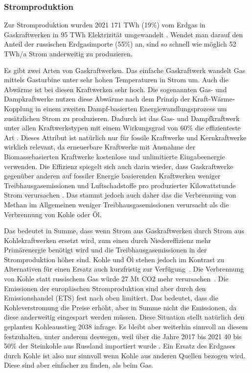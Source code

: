 \subsubsection{Stromproduktion}
\label{sec:Stromproduktion}

Zur Stromproduktion wurden 2021 171 TWh (19\%) vom Erdgas in Gaskraftwerken in 95 TWh Elektrizität umgewandelt \cite{clausen2022}. Wendet man darauf den Anteil der russischen Erdgasimporte (55\%) an, sind so schnell wie möglich 52 TWh/a Strom anderweitig zu produzieren.

Es gibt zwei Arten von Gaskraftwerken. Das einfache Gaskraftwerk wandelt Gas mittels Gasturbine unter sehr hohen Temperaturen in Strom um. Auch die Abwärme ist bei diesen Kraftwerken sehr hoch. Die sogenannten Gas- und Dampkraftwerke nutzen diese Abwärme nach dem Prinzip der Kraft-Wärme-Kopplung in einem zweiten Dampf-basierten Energiewandlungsprozess um zusätzlichen Strom zu produzieren. Dadurch ist das Gas- und Dampfkraftwerk unter allen Kraftwerkstypen mit einem Wirkungsgrad von 60\% die effizienteste Art \cite{ei1}. Dieses Attribut ist natürlich nur für fossile Kraftwerke und Kernkraftwerke wirklich relevant, da erneuerbare Kraftwerke mit Ausnahme der Biomassebasierten Kraftwerke kostenlose und unlimitierte Eingabeenergie verwenden.
Die Effizienz spiegelt sich auch darin wieder, dass Gaskraftwerke gegenüber anderen auf fossiler Energie basierenden Kraftwerken weniger Treibhausgasemissionen und Luftschadstoffe pro produzierter Kilowattstunde Strom verursachen \cite{uba-co2}. Das stammt jedoch auch daher das die Verbrennung von Methan im Allgemeinen weniger Treibhausgasemissionen verursacht als die Verbrennung von Kohle oder Öl.

Das bedeutet in Summe, dass wenn Strom aus Gaskraftwerken durch Strom aus Kohlekraftwerken ersetzt wird, zum einen durch Niedereffizienz mehr Primärenergie benötigt wird und die Treibhausgasemissionen in der Stromproduktion höher sind. Kohle und Öl stehen jedoch im Kontrast zu Alternativen für einen Ersatz auch kurzfristig zur Verfügung~\cite{iea2022}. Die Verbrennung von Kohle statt russischem Gas würde 27 Mt CO2 mehr verursachen~\cite{leo}. 
Die Emissionen der europäischen Stromproduktion sind aber durch den Emissionshandel (ETS) fest nach oben limitiert. Das bedeutet, dass die Kohleverstromung die Preise erhöht, aber in Summe nicht die Emissionen, da diese anderweitig eingespart werden müssen. Diese Situation stellt natürlich den geplanten Kohleausstieg 2038 infrage. Es bleibt aber weiterhin sinnvoll an diesem festzuhalten, unter anderem deswegen, weil über die Jahre 2017 bis 2021 40 bis 50\% der Steinkohle aus Russland importiert wurde \cite{steinkohle-import}. Ein Ersatz des Erdgases durch Kohle ist also nur sinnvoll wenn Kohle aus anderen Quellen bezogen wird. Diese sind aber einfacher zu finden, als beim Gas.

